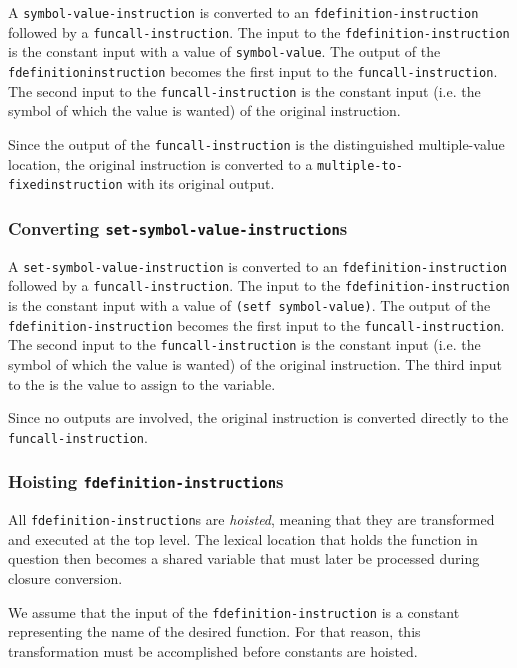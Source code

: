 A \texttt{symbol-value-instruction} is converted to an
\texttt{fdefinition-instruction} followed by a
\texttt{funcall-instruction}.  The input to the
\texttt{fdefinition-instruction} is the constant input with a value of
\texttt{symbol-value}.  The output of the
\texttt{fdefinition\-instruction} becomes the first input to the
\texttt{funcall-instruction}.  The second input to the
\texttt{funcall-instruction} is the constant input (i.e. the symbol
of which the value is wanted) of the original instruction.

Since the output of the \texttt{funcall-instruction} is the
distinguished multiple-value location, the original instruction is
converted to a \texttt{multiple-to-fixed\-instruction} with its
original output.

\subsubsection{Converting \texttt{set-symbol-value-instruction}s}

A \texttt{set-symbol-value-instruction} is converted to an
\texttt{fdefinition-instruction} followed by a
\texttt{funcall-instruction}.  The input to the
\texttt{fdefinition-instruction} is the constant input with a value of
\texttt{(setf symbol-value)}.  The output of the
\texttt{fdefinition-instruction} becomes the first input to the
\texttt{funcall-instruction}.  The second input to the
\texttt{funcall-instruction} is the constant input (i.e. the symbol
of which the value is wanted) of the original instruction.  The third
input to the is the value to assign to the variable.

Since no outputs are involved, the original instruction is converted
directly to the \texttt{funcall-instruction}.

\subsubsection{Hoisting \texttt{fdefinition-instruction}s}

All \texttt{fdefinition-instruction}s are \emph{hoisted}, meaning that
they are transformed and executed at the top level.  The lexical
location that holds the function in question then becomes a shared
variable that must later be processed during closure conversion.

We assume that the input of the \texttt{fdefinition-instruction} is a
constant representing the name of the desired function.  For that
reason, this transformation must be accomplished before constants are
hoisted.

